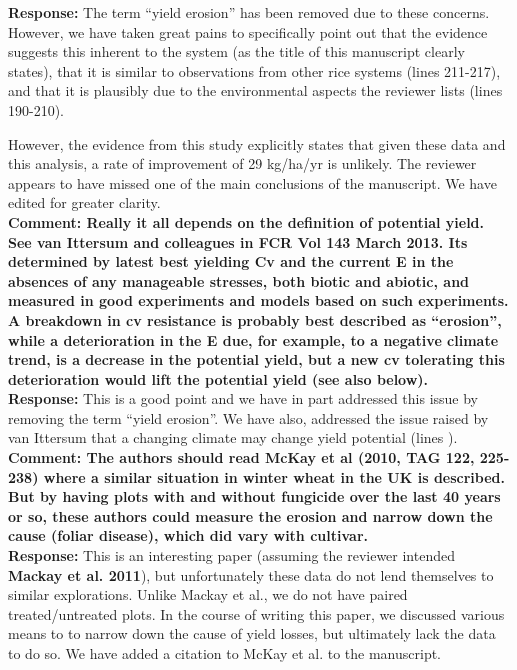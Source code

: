 \documentclass{article} \usepackage[margin=1in]{geometry}
\begin{document}
\textbf{Response:} The term ``yield erosion'' has been removed due to
these concerns. However, we have taken great pains to specifically
point out that the evidence suggests this inherent to the system (as
the title of this manuscript clearly states), that it is similar to
observations from other rice systems (lines 211-217), and that it is
plausibly due to the environmental aspects the reviewer lists (lines
190-210).

However, the evidence from this study explicitly states that given
these data and this analysis, a rate of improvement of 29 kg/ha/yr is
unlikely. The reviewer appears to have missed one of the main
conclusions of the manuscript. We have edited for greater clarity. \\

\textbf{Comment: Really it all depends on the definition of potential
  yield. See van Ittersum and colleagues in FCR Vol 143 March
  2013. Its determined by latest best yielding Cv and the current E in
  the absences of any manageable stresses, both biotic and abiotic,
  and measured in good experiments and models based on such
  experiments. A breakdown in cv resistance is probably best described
  as “erosion”, while a deterioration in the E due, for example, to a
  negative climate trend, is a decrease in the potential yield, but a
  new cv tolerating this deterioration would lift the potential yield
  (see also below).}\\

\textbf{Response:} This is a good point and we have in part addressed
this issue by removing the term “yield erosion”. We have also,
addressed the issue raised by van Ittersum that a changing climate may
change yield potential (lines ).\\

\textbf{Comment: The authors should read McKay et al (2010, TAG 122,
  225-238) where a similar situation in winter wheat in the UK is
  described. But by having plots with and without fungicide over the
  last 40 years or so, these authors could measure the erosion and
  narrow down the cause (foliar disease), which did vary with
  cultivar.}\\

\textbf{Response:} This is an interesting paper (assuming the reviewer
intended \textbf{Mackay et al. 2011}), but unfortunately these data do
not lend themselves to similar explorations. Unlike Mackay et al., we
do not have paired treated/untreated plots. In the course of writing
this paper, we discussed various means to to narrow down the cause of
yield losses, but ultimately lack the data to do so. We have added a
citation to McKay et al. to the manuscript.\\
\end{document}
